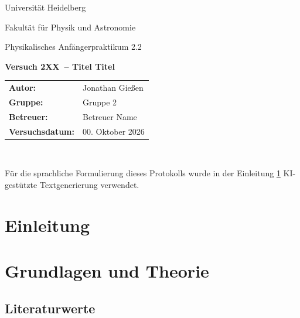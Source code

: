\documentclass[12pt,a4paper,titlepage]{scrartcl}
\numberwithin{equation}{section}
\numberwithin{table}{section}
\numberwithin{figure}{section}
\newcommand{\versuch}{Versuch 2XX}
\newcommand{\titel}{Titel Titel}
\newcommand{\praktikum}{Physikalisches Anfängerpraktikum 2.2}
\newcommand{\autor}{Jonathan Gießen}
\newcommand{\gruppe}{Gruppe 2}
\newcommand{\datum}{00. Oktober 2026}
\newcommand{\betreuer}{Betreuer Name}
\begin{document}
\pagestyle{scrheadings}

\begin{titlepage}



    \centering
    \vspace*{4cm}
    {\large Universität Heidelberg\par}
    {\small Fakultät für Physik und Astronomie\par}
    {\Large \praktikum\par}
    \vspace{0.8cm}
    {\LARGE \bfseries \versuch\ -- \titel\par}
    \vspace{1.5cm}

    \begin{tabular}{ll}
        \textbf{Autor:} & \autor\\
        \textbf{Gruppe:} & \gruppe\\
        \textbf{Betreuer:} & \betreuer\\
        \textbf{Versuchsdatum:} & \datum\\
    \end{tabular}

    \vfill
    \hrulefill\
\end{titlepage}

\tableofcontents

\bigskip
\begin{tcolorbox}[colback=gray!5,colframe=gray!60,boxrule=0.8pt,arc=0.01mm,title=KI-Hinweis]
    Für die sprachliche Formulierung dieses Protokolls wurde in der Einleitung \ref{sec:Einleitung} KI-gestützte Textgenerierung verwendet. 
\end{tcolorbox}

\clearpage


\section{Einleitung}\label{sec:Einleitung}


\section{Grundlagen und Theorie}\label{sec:Grundlagen}


\subsection{Literaturwerte}
\end{document}

